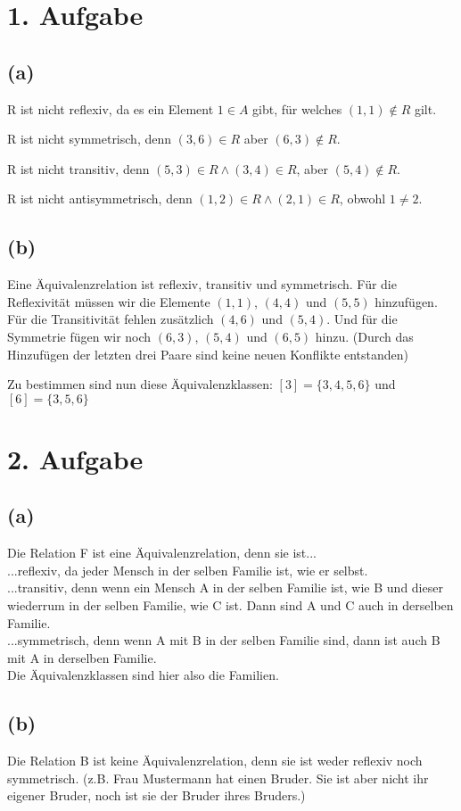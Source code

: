 \documentclass[]{article}
\newcommand{\A}{\land}
\begin{document}
\section*{1. Aufgabe}
\subsection*{(a)}
	R ist nicht reflexiv, da es ein Element $1 \in A$ gibt, für welches $(1,1) \notin R$ gilt.

	R ist nicht symmetrisch, denn $(3,6) \in R$ aber $(6,3) \notin R$.

	R ist nicht transitiv, denn $(5,3) \in R \A (3,4) \in R$, aber $(5,4) \notin R$.

	R ist nicht antisymmetrisch, denn $(1,2) \in R \A (2,1) \in R$, obwohl $1 \neq 2$.

\subsection*{(b)}
	Eine Äquivalenzrelation ist reflexiv, transitiv und symmetrisch. Für die Reflexivität müssen wir die Elemente $(1,1)$, $(4,4)$ und $(5,5)$ hinzufügen. Für die Transitivität fehlen zusätzlich $(4,6)$ und $(5,4)$. Und für die Symmetrie fügen wir noch $(6,3)$, $(5,4)$ und $(6,5)$ hinzu. (Durch das Hinzufügen der letzten drei Paare sind keine neuen Konflikte entstanden)

	Zu bestimmen sind nun diese Äquivalenzklassen:
	$[3] = \{3, 4, 5, 6\}$ und $[6] = \{3,5,6\}$
\section*{2. Aufgabe}
\subsection*{(a)}
	Die Relation F ist eine Äquivalenzrelation, denn sie ist...\\
	...reflexiv, da jeder Mensch in der selben Familie ist, wie er selbst.\\
	...transitiv, denn wenn ein Mensch A in der selben Familie ist, wie B und dieser wiederrum in der selben Familie, wie C ist. Dann sind A und C auch in derselben Familie.\\
	...symmetrisch, denn wenn A mit B in der selben Familie sind, dann ist auch B mit A in derselben Familie.\\
	Die Äquivalenzklassen sind hier also die Familien.
\subsection*{(b)}
	Die Relation B ist keine Äquivalenzrelation, denn sie ist weder reflexiv noch symmetrisch. (z.B. Frau Mustermann hat einen Bruder. Sie ist aber nicht ihr eigener Bruder, noch ist sie der Bruder ihres Bruders.)
\end{document}
